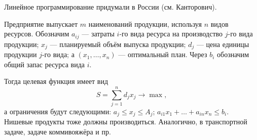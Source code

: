   Линейное программирование придумали в России (см. Канторович).

  \begin{example}
  Предприятие выпускает $ m $ наименований продукции, используя $ n $ видов
  ресурсов. Обозначим $ a_{ij} $ --- затраты $ i $-го вида ресурса на
  производство $ j $-го вида продукции; $ x_j $ --- планируемый объём выпуска
  продукции; $ d_j $ --- цена единицы продукции $ j $-го вида; а $ (x_1, \ldots,
  x_n) $ --- оптимальный план. Через $ b_i $ обозначим общий запас ресурса вида
  $ i $.

  Тогда целевая функция имеет вид
  \[
    S = \sum_{j=1}^n d_j x_j \to \max,
  \]
  а ограничения будут следующими: $ a_j \leqslant x_j \leqslant A_j $; $
  a_{i1}x_1 + \ldots + a_{in}x_n \leqslant b_i $. Нишевые продукты тоже должны
  производиться. Аналогично, в транспортной
  задаче, задаче коммивояжёра и пр.
  
\end{example}



